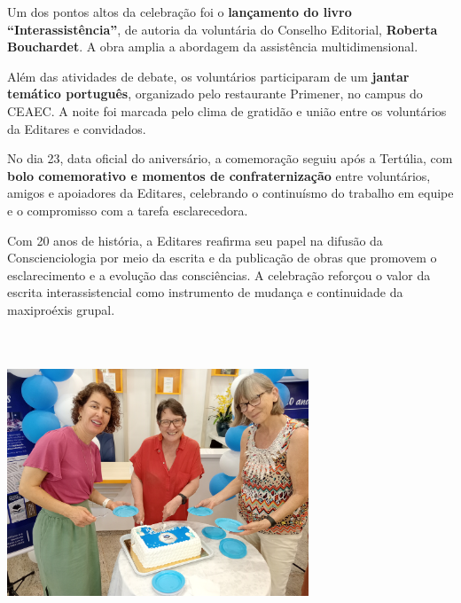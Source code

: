 \documentclass{gescons}
\begin{document}
\begin{multicols}{2}
Um dos pontos altos da celebração foi o \textbf{lançamento do livro ``Interassistência''}, de autoria da voluntária do Conselho Editorial, \textbf{Roberta Bouchardet}. A obra amplia a abordagem da assistência multidimensional.

Além das atividades de debate, os voluntários participaram de um \textbf{jantar temático português}, organizado pelo restaurante Primener, no campus do CEAEC. A noite foi marcada pelo clima de gratidão e união entre os voluntários da Editares e convidados.

No dia 23, data oficial do aniversário, a comemoração seguiu após a Tertúlia, com \textbf{bolo comemorativo e momentos de confraternização} entre voluntários, amigos e apoiadores da Editares, celebrando o continuísmo do trabalho em equipe e o compromisso com a tarefa esclarecedora.

Com 20 anos de história, a Editares reafirma seu papel na difusão da Conscienciologia por meio da escrita e da publicação de obras que promovem o esclarecimento e a evolução das consciências. A celebração reforçou o valor da escrita interassistencial como instrumento de mudança e continuidade da maxiproéxis grupal.



\noindent\includegraphics[width=9cm, height=9cm]{articles/resumo/fotos/materia1/IMG20241023143149.jpg}
        
    \end{multicols}
\end{document}
